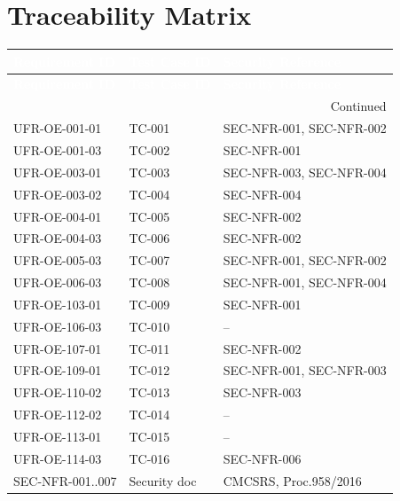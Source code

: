 \section{Traceability Matrix}
\begin{center}
\begin{longtable}{|p{3.5cm}|p{3.5cm}|p{3cm}|}
\hline
\rowcolor{mooveblue}
\textcolor{white}{\textbf{Requirement ID}} & \textcolor{white}{\textbf{Test Case ID}} & \textcolor{white}{\textbf{Security Reference}} \\
\hline
\endfirsthead
\hline
\rowcolor{mooveblue}
\textcolor{white}{\textbf{Requirement ID}} & \textcolor{white}{\textbf{Test Case ID}} & \textcolor{white}{\textbf{Security Reference}} \\
\hline
\endhead
\hline
\multicolumn{3}{|r|}{Continued} \\
\hline
\endfoot
\hline
\endlastfoot
UFR-OE-001-01 & TC-001 & SEC-NFR-001, SEC-NFR-002 \\
UFR-OE-001-03 & TC-002 & SEC-NFR-001 \\
UFR-OE-003-01 & TC-003 & SEC-NFR-003, SEC-NFR-004 \\
UFR-OE-003-02 & TC-004 & SEC-NFR-004 \\
UFR-OE-004-01 & TC-005 & SEC-NFR-002 \\
UFR-OE-004-03 & TC-006 & SEC-NFR-002 \\
UFR-OE-005-03 & TC-007 & SEC-NFR-001, SEC-NFR-002 \\
UFR-OE-006-03 & TC-008 & SEC-NFR-001, SEC-NFR-004 \\
UFR-OE-103-01 & TC-009 & SEC-NFR-001 \\
UFR-OE-106-03 & TC-010 & – \\
UFR-OE-107-01 & TC-011 & SEC-NFR-002 \\
UFR-OE-109-01 & TC-012 & SEC-NFR-001, SEC-NFR-003 \\
UFR-OE-110-02 & TC-013 & SEC-NFR-003 \\
UFR-OE-112-02 & TC-014 & – \\
UFR-OE-113-01 & TC-015 & – \\
UFR-OE-114-03 & TC-016 & SEC-NFR-006 \\
SEC-NFR-001..007 & Security doc & CMCSRS, Proc.958/2016 \\
\hline
\end{longtable}
\end{center}

